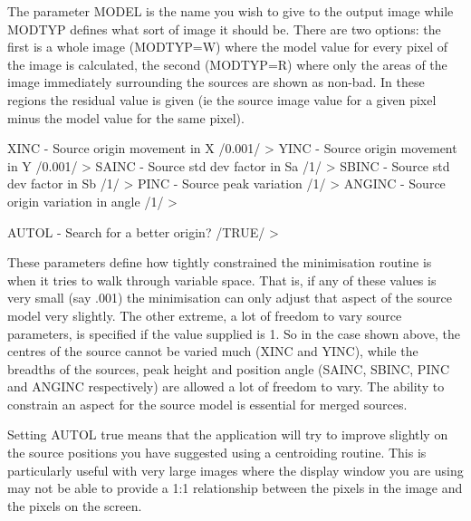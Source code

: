 \documentclass[twoside,11pt]{starlink}
\begin{document}
The parameter MODEL is the name you wish to give to the output image while
MODTYP defines what sort of image it should be. There are two options: the
first is a whole image (MODTYP=W) where the model value for every pixel of the
image is calculated, the second (MODTYP=R) where only the areas of the image
immediately surrounding the sources are shown as non-bad. In these regions the
residual value is given (ie the source image value for a given pixel
minus the model value for the same pixel).

\begin{terminalv}
XINC - Source origin movement in X /0.001/ >
YINC - Source origin movement in Y /0.001/ >
SAINC - Source std dev factor in Sa /1/ >
SBINC - Source std dev factor in Sb /1/ >
PINC - Source peak variation /1/ >
ANGINC - Source origin variation in angle /1/ >

AUTOL - Search for a better origin? /TRUE/ >
\end{terminalv}


These parameters define how tightly constrained the minimisation routine
is when it tries to walk through variable space. That is, if any of these
values is very small (say .001) the minimisation can only adjust that
aspect of the source model very slightly. The other extreme, a lot of freedom
to vary source parameters, is specified if the value supplied is 1. So in the
case shown above, the centres of the source cannot be varied
much (XINC and YINC), while the breadths of the sources, peak height and
position angle (SAINC, SBINC, PINC and ANGINC respectively) are allowed
a lot of freedom to vary. The ability to constrain an aspect for the
source model is essential for merged sources.

Setting AUTOL true means that the application will try to improve slightly
on the source positions you have suggested using a centroiding routine.
This is particularly useful with very large images where the display
window you
are using may not be able to provide a 1:1 relationship between the
pixels in the image and the pixels on the screen.
\end{document}
